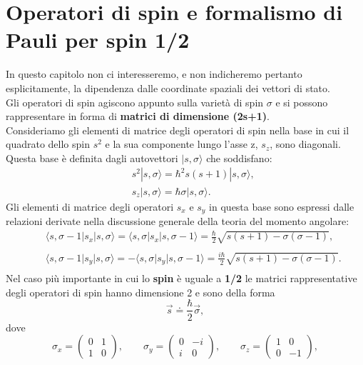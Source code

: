 \section{Operatori di spin e formalismo di Pauli per spin 1/2}
In questo capitolo non ci interesseremo, e non indicheremo pertanto esplicitamente, la dipendenza dalle coordinate spaziali dei vettori di stato.\\
Gli operatori di spin agiscono appunto sulla varietà di spin $\sigma$ e si possono rappresentare in forma di \textbf{matrici di dimensione (2s+1)}.\\
Consideriamo gli elementi di matrice degli operatori di spin nella base in cui il quadrato dello spin $s^{2}$ e la sua componente lungo l'asse z, $s_{z}$, sono diagonali. Questa base è definita dagli autovettori $|s,\sigma\rangle$ che soddisfano:
\begin{eqnarray}
& &s^{2} |s, \sigma\rangle =\hbar^{2}s(s+1)|s, \sigma\rangle ,\\
& &s_{z} |s, \sigma\rangle =\hbar \sigma |s, \sigma\rangle . 
\end{eqnarray}
Gli elementi di matrice degli operatori $s_{x}$ e $s_{y}$ in questa base sono espressi dalle relazioni derivate  nella discussione generale della teoria del momento angolare:
\begin{eqnarray}
& &\langle s, \sigma -1\vert s_{x}\vert s, \sigma\rangle = \langle s, \sigma\vert s_{x}\vert s, \sigma -1\rangle =\frac{\hbar}{2}\sqrt{s(s+1)-\sigma(\sigma-1)} , \nonumber \\
\\
& &\langle s, \sigma -1\vert s_{y}\vert s, \sigma\rangle =- \langle s, \sigma\vert s_{y}\vert s, \sigma -1\rangle =\frac{i\hbar}{2}\sqrt{s(s+1)-\sigma(\sigma-1)} . \nonumber \\
\end{eqnarray}
Nel caso più importante in cui lo \textbf{spin} è uguale a \textbf{1/2} le matrici rappresentative degli operatori di spin hanno dimensione 2 e sono della forma
\begin{equation}
\vec{s}\doteq\frac{\hbar}{2}\vec{\sigma} ,
\end{equation}
dove
\begin{equation}
\sigma_{x}=\begin{pmatrix}
0 & 1 \\
1 & 0
\end{pmatrix}, \qquad \sigma_{y}=\begin{pmatrix}
0 & -i \\
i & 0
\end{pmatrix},\qquad \sigma_{z}=\begin{pmatrix}
1 & 0 \\
0 & -1
\end{pmatrix},
\end{equation}

